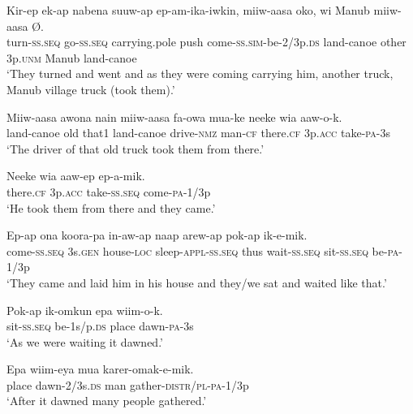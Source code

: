 \ea
\gll  Kir-ep  ek-ap  nabena  suuw-ap  ep-am-ika-iwkin,                miiw-aasa  oko,  wi  Manub  miiw-aasa  Ø. \\
turn-\textsc{ss.seq}  go-\textsc{ss.seq}  carrying.pole  push  come-\textsc{ss}.\textsc{sim}-be-2/3p.\textsc{ds}   land-canoe  other  3p.\textsc{unm}  Manub  land-canoe \\


\glt ‘They turned and went and as they were coming carrying him, another truck, Manub village truck (took them).’ \\
\z


\ea
\gll  Miiw-aasa  awona  nain  miiw-aasa  fa-owa  mua-ke  neeke   wia  aaw-o-k. \\
land-canoe  old  that1  land-canoe  drive-\textsc{nmz}  man-\textsc{cf}  there.\textsc{cf}  3p.\textsc{acc}  take-\textsc{pa}-3s \\


\glt ‘The driver of that old truck took them from there.’ \\
\z


\ea
\gll  Neeke  wia  aaw-ep  ep-a-mik. \\
there.\textsc{cf}  3p.\textsc{acc}  take-\textsc{ss.seq}  come-\textsc{pa}-1/3p \\
\glt ‘He took them from there and they came.’ \\
\z


\ea
\gll  Ep-ap  ona  koora-pa  in-aw-ap  naap              arew-ap  pok-ap  ik-e-mik. \\
come-\textsc{ss.seq}  3s.\textsc{gen}  house-\textsc{loc}  sleep-\textsc{appl}-\textsc{ss.seq}  thus wait-\textsc{ss.seq}  sit-\textsc{ss.seq}  be-\textsc{pa}-1/3p \\


\glt ‘They came and laid him in his house and they/we sat and waited like that.’ \\
\z


\ea
\gll  Pok-ap  ik-omkun  epa  wiim-o-k. \\
sit-\textsc{ss.seq}  be-1s/p.\textsc{ds}  place  dawn-\textsc{pa}-3s \\
\glt ‘As we were waiting it dawned.’ \\
\z


\ea
\gll  Epa  wiim-eya  mua  karer-omak-e-mik. \\
place  dawn-2/3s.\textsc{ds}  man  gather-\textsc{distr}/\textsc{pl}-\textsc{pa}-1/3p \\
\glt ‘After it dawned many people gathered.’ \\
\z


